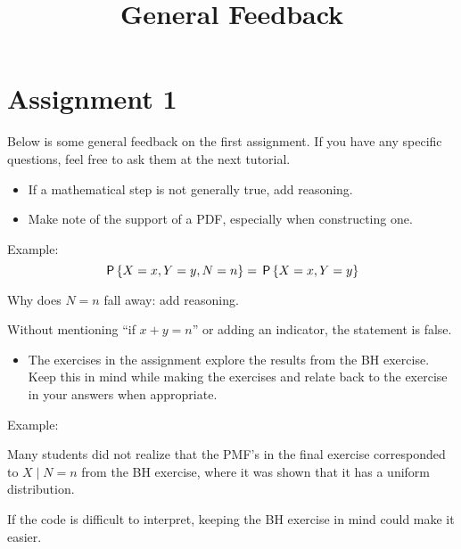 


\title{General Feedback}


\maketitle

\section*{Assignment 1}
Below is some general feedback on the first assignment. If you have
any specific questions, feel free to ask them at the next tutorial.

\begin{itemize}
\item If a mathematical step is not generally true, add reasoning.
\item Make note of the support of a PDF, especially when constructing one.
\end{itemize}

Example:
$$\P{X=x, Y=y, N=n} = \P{X=x, Y=y}$$

Why does $N=n$ fall away: add reasoning.

Without mentioning ``if $x+y=n$'' or adding an indicator, the
statement is false.

\begin{itemize}
\item The exercises in the assignment explore the results from the BH
exercise. Keep this in mind while making the exercises and relate
back to the exercise in your answers when appropriate.
\end{itemize}

Example:

Many students did not realize that the PMF's in the final exercise
corresponded to $X\mid N=n$ from the BH exercise, where it was shown
that it has a uniform distribution.

If the code is difficult to interpret, keeping the BH exercise in
mind could make it easier.


